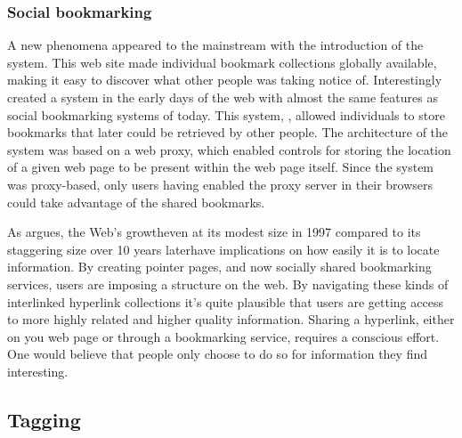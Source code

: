 
\subsubsection{Social bookmarking}

A new phenomena appeared to the mainstream with the introduction of the
%
 system. This web site made individual
bookmark collections globally available, making it easy to discover what other
people was taking notice of. Interestingly \citet{keller97} created a system
in the early days of the web with almost the same features as social
bookmarking systems of today. This system, , allowed
individuals to store bookmarks that later could be retrieved by other people.
The architecture of the system was based on a web proxy, which enabled
controls for storing the location of a given web page to be present within the
web page itself. Since the system was proxy-based, only users having enabled
the proxy server in their browsers could take advantage of the shared
bookmarks.

As \citet[]{dieberger97} argues, the Web's growth\dash{}even at its
modest size in 1997 compared to its staggering size over 10 years
later\dash{}have implications on how easily it is to locate information.
By creating pointer
pages, and now socially shared bookmarking services, users are imposing a
structure on the web. By navigating these kinds of interlinked hyperlink
collections it's quite plausible that users are getting access to more highly
related and higher quality information. Sharing a hyperlink, either on you web
page or through a bookmarking service, requires a conscious effort. One would
believe that people only choose to do so for information they find
interesting.

\subsection{Tagging}

